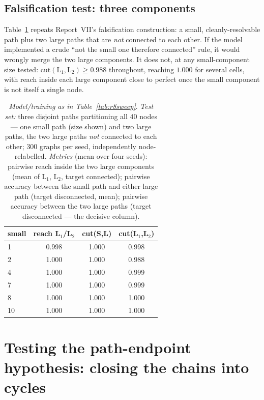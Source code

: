 \documentclass[11pt,a4paper]{article}
\begin{document}
\subsection{Falsification test: three components}
\label{sec:battery-threeway}

Table~\ref{tab:r8threeway} repeats Report~VII's falsification construction: a
small, cleanly-resolvable path plus two large paths that are \emph{not}
connected to each other. If the model implemented a crude ``not the small one
therefore connected'' rule, it would wrongly merge the two large components.
It does not, at any small-component size tested: $\mathrm{cut}(\mathrm{L}_1,
\mathrm{L}_2)\ge0.988$ throughout, reaching $1.000$ for several cells, with
reach inside each large component close to perfect once the small component
is not itself a single node.

\begin{table}[H]\centering\small
\begin{tabular}{lccc}
\toprule
small & reach L$_1$/L$_2$ & cut(S,L) & cut(L$_1$,L$_2$)\\
\midrule
1  & 0.998 & 1.000 & 0.998\\
2  & 1.000 & 1.000 & 0.988\\
4  & 1.000 & 1.000 & 0.999\\
7  & 1.000 & 1.000 & 0.999\\
8  & 1.000 & 1.000 & 1.000\\
10 & 1.000 & 1.000 & 1.000\\
\bottomrule
\end{tabular}
\caption{\emph{Model/training as in Table~\ref{tab:r8sweep}}. \emph{Test
set:} three disjoint paths partitioning all $40$ nodes --- one small path
(size shown) and two large paths, the two large paths \emph{not} connected
to each other; $300$ graphs per seed, independently node-relabelled.
\emph{Metrics} (mean over four seeds): pairwise reach inside the two large
components (mean of L$_1$, L$_2$, target connected); pairwise accuracy
between the small path and either large path (target disconnected, mean);
pairwise accuracy between the two large paths (target disconnected --- the
decisive column).}
\label{tab:r8threeway}
\end{table}

\section{Testing the path-endpoint hypothesis: closing the chains into cycles}
\label{sec:cycles}
\end{document}

